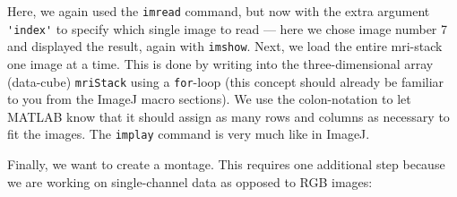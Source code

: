 Here, we again used the \lstinline{imread} command, but now with the extra argument \lstinline{'index'} to specify which single image to read --- here we chose image number 7 and displayed the result, again with \lstinline{imshow}.
Next, we load the entire mri-stack one image at a time. 
This is done by writing into the three-dimensional array (data-cube) \lstinline{mriStack} using a \lstinline{for}-loop (this concept should already be familiar to you from the ImageJ macro sections).
We use the colon-notation to let MATLAB know that it should assign as many rows and columns as necessary to fit the images.
The \lstinline{implay} command is very much like in ImageJ.

Finally, we want to create a montage. 
This requires one additional step because we are working on single-channel data as opposed to RGB images: